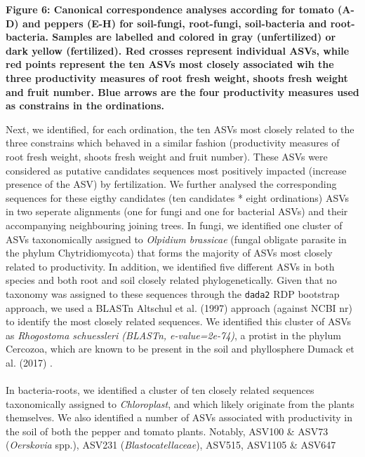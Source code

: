 \documentclass[11pt,]{article}
\begin{document}
\textbf{Figure 6: Canonical correspondence analyses according for tomato
(A-D) and peppers (E-H) for soil-fungi, root-fungi, soil-bacteria and
root-bacteria. Samples are labelled and colored in gray (unfertilized)
or dark yellow (fertilized). Red crosses represent individual ASVs,
while red points represent the ten ASVs most closely associated wih the
three productivity measures of root fresh weight, shoots fresh weight
and fruit number. Blue arrows are the four productivity measures used as
constrains in the ordinations.} ~\\
\hspace*{0.333em}

\newpage  

Next, we identified, for each ordination, the ten ASVs most closely
related to the three constrains which behaved in a similar fashion
(productivity measures of root fresh weight, shoots fresh weight and
fruit number). These ASVs were considered as putative candidates
sequences most positively impacted (increase presence of the ASV) by
fertilization. We further analysed the corresponding sequences for these
eigthy candidates (ten candidates * eight ordinations) ASVs in two
seperate alignments (one for fungi and one for bacterial ASVs) and their
accompanying neighbouring joining trees. In fungi, we identified one
cluster of ASVs taxonomically assigned to \emph{Olpidium brassicae}
(fungal obligate parasite in the phylum Chytridiomycota) that forms the
majority of ASVs most closely related to productivity. In addition, we
identified five different ASVs in both species and both root and soil
closely related phylogenetically. Given that no taxonomy was assigned to
these sequences through the \texttt{dada2} RDP bootstrap approach, we
used a BLASTn Altschul et al. (1997) approach (against NCBI nr) to
identify the most closely related sequences. We identified this cluster
of ASVs as \emph{Rhogostoma schuessleri (BLASTn, e-value=2e-74)}, a
protist in the phylum Cercozoa, which are known to be present in the
soil and phyllosphere Dumack et al. (2017) .\\
\hspace*{0.333em}\\
In bacteria-roots, we identified a cluster of ten closely related
sequences taxonomically assigned to \emph{Chloroplast}, and which likely
originate from the plants themselves. We also identified a number of
ASVs associated with productivity in the soil of both the pepper and
tomato plants. Notably, ASV100 \& ASV73 (\emph{Oerskovia} spp.), ASV231
(\emph{Blastocatellaceae}), ASV515, ASV1105 \& ASV647
\end{document}
